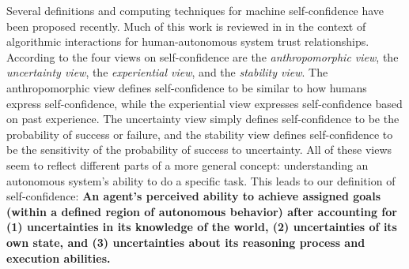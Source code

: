 
 Several definitions and computing techniques for machine self-confidence have been proposed recently. Much of this work is reviewed in \cite{Israelsen2017-ym} in the context of algorithmic interactions for human-autonomous system trust relationships. %
According to \cite{Sweet2016-tz} the four views on self-confidence are the \textit{anthropomorphic view}, the \textit{uncertainty view}, the \textit{experiential view}, and the \textit{stability view}. The anthropomorphic view defines self-confidence to be similar to how humans express self-confidence, while the experiential view expresses self-confidence based on past experience. The uncertainty view simply defines self-confidence to be the probability of success or failure, and the stability view defines self-confidence to be the sensitivity of the probability of success to uncertainty. All of these views seem to reflect different parts of a more general concept: understanding an autonomous system's ability to do a specific task. 
This leads to our definition of self-confidence: \textbf{An agent's perceived ability to achieve assigned goals (within a defined region of autonomous behavior) after accounting for (1) uncertainties in its knowledge of the world, (2) uncertainties of its own state, and (3) uncertainties about its reasoning process and execution abilities.}

